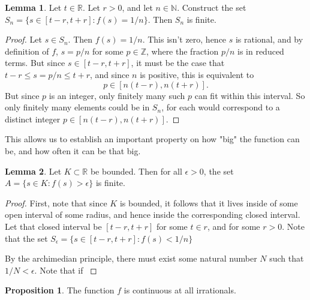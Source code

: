 \documentclass[12pt]{article}
\newcommand{\R}{\mathbb{R}}
\newcommand{\Z}{\mathbb{Z}}
\newcommand{\N}{\mathbb{N}}
\theoremstyle{definition}
\newtheorem{proposition}{Proposition}
\newtheorem{lemma}{Lemma}
\begin{document}
\begin{lemma}
    Let $t\in \R$. Let $r > 0$, and let $ n\in \N $. Construct the set $S_n = \{s\in [t - r, t + r]: f(s) = 1/n\}$. Then $S_n$ is finite.
\end{lemma}

\begin{proof}
    Let $s\in S_n$. Then $ f(s) = 1/n $. This isn't zero, hence $s$ is rational, and by definition of $f$, $s = p/n$ for some $p\in \Z$, where the fraction $p/n$ is in reduced terms. But since $s\in [t - r, t + r]$, it must be the case that $ t - r\le s=p/n\le t + r$, and since $n $ is positive, this is equivalent to 
    \[
        p\in [n(t - r) , n(t + r)].
        \]
    But since $p$ is an integer, only finitely many such $p$ can fit within this interval. So only finitely many elements could be in $S_n$, for each would correspond to a distinct integer $p\in [n(t - r) , n(t + r)]$.
\end{proof}

This allows us to establish an important property on how "big" the function can be, and how often it can be that big. 

\begin{lemma}\label{finitelyManyBig}
    Let $K\subset \R$ be bounded. Then for all $\epsilon > 0$, the set $ A = \{s\in K: f(s) > \epsilon\} $ is finite.
\end{lemma}

\begin{proof}
    First, note that since $K$ is bounded, it follows that it lives inside of some open interval of some radius, and hence inside the corresponding closed interval. Let that closed interval be $ [t - r, t + r] $ for some $t\in r$, and for some $r> 0$. Note that the set $ S_\epsilon = \{s\in [t - r, t + r]: f(s) < 1/n\} $

    By the archimedian principle, there must exist some natural number $N$ such that $1/N < \epsilon$. Note that if $  $
\end{proof}

\begin{proposition}
    The function $f$ is continuous at all irrationals. 
\end{proposition}
\end{document}
